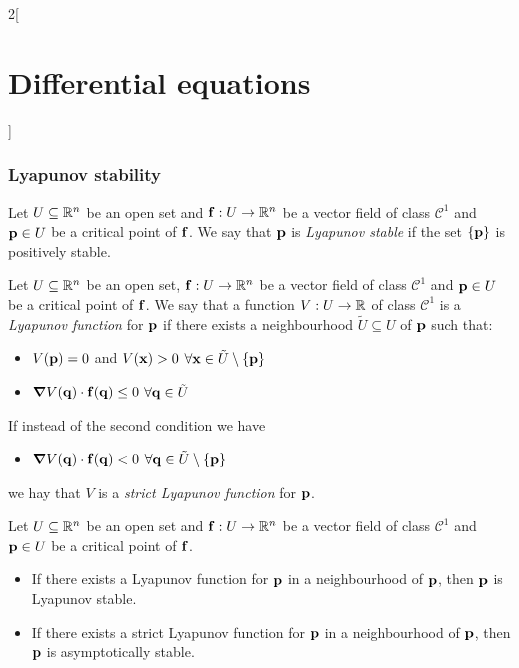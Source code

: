 \documentclass[../../../main.tex]{subfiles}
\begin{document}
\begin{multicols}{2}[\section{Differential equations}]
  \subsubsection{Lyapunov stability}
  \begin{definition}
    Let $U\subseteq \mathbb{R}^n$ be an open set and $\boldsymbol{\mathrm{f}}:U\rightarrow\mathbb{R}^n$ be a vector field of class $\mathcal{C}^1$ and $\boldsymbol{\mathrm{p}}\in U$ be a critical point of $\boldsymbol{\mathrm{f}}$. We say that $\boldsymbol{\mathrm{p}}$ is \emph{Lyapunov stable} if the set $\{\boldsymbol{\mathrm{p}}\}$ is positively stable.
  \end{definition}
  \begin{definition}
    Let $U\subseteq \mathbb{R}^n$ be an open set, $\boldsymbol{\mathrm{f}}:U\rightarrow\mathbb{R}^n$ be a vector field of class $\mathcal{C}^1$ and $\boldsymbol{\mathrm{p}}\in U$ be a critical point of $\boldsymbol{\mathrm{f}}$. We say that a function $V:U\rightarrow\mathbb{R}$ of class $\mathcal{C}^1$ is a \emph{Lyapunov function} for $\boldsymbol{\mathrm{p}}$ if there exists a neighbourhood $\tilde{U}\subseteq U$ of $\boldsymbol{\mathrm{p}}$ such that:
    \begin{itemize}
      \item $V(\boldsymbol{\mathrm{p}})=0$ and $V(\boldsymbol{\mathrm{x}})>0$ $\forall \boldsymbol{\mathrm{x}}\in\tilde{U}\setminus\{\boldsymbol{\mathrm{p}}\}$
      \item $\grad V(\boldsymbol{\mathrm{q}})\cdot \boldsymbol{\mathrm{f}}(\boldsymbol{\mathrm{q}})\leq 0$ $\forall \boldsymbol{\mathrm{q}}\in \tilde{U}$
    \end{itemize}
    If instead of the second condition we have
    \begin{itemize}
      \item $\grad V(\boldsymbol{\mathrm{q}})\cdot \boldsymbol{\mathrm{f}}(\boldsymbol{\mathrm{q}})<0$ $\forall \boldsymbol{\mathrm{q}}\in \tilde{U}\setminus\{\boldsymbol{\mathrm{p}}\}$
    \end{itemize}
    we hay that $V$ is a \emph{strict Lyapunov function} for $\boldsymbol{\mathrm{p}}$.
  \end{definition}
  \begin{theorem}
    Let $U\subseteq \mathbb{R}^n$ be an open set and $\boldsymbol{\mathrm{f}}:U\rightarrow\mathbb{R}^n$ be a vector field of class $\mathcal{C}^1$ and $\boldsymbol{\mathrm{p}}\in U$ be a critical point of $\boldsymbol{\mathrm{f}}$.
    \begin{itemize}
      \item If there exists a Lyapunov function for $\boldsymbol{\mathrm{p}}$ in a neighbourhood of $\boldsymbol{\mathrm{p}}$, then $\boldsymbol{\mathrm{p}}$ is Lyapunov stable.
      \item If there exists a strict Lyapunov function for $\boldsymbol{\mathrm{p}}$ in a neighbourhood of $\boldsymbol{\mathrm{p}}$, then $\boldsymbol{\mathrm{p}}$ is asymptotically stable.
    \end{itemize}
  \end{theorem}
  \begin{theorem}

\end{theorem}
\end{multicols}
\end{document}
